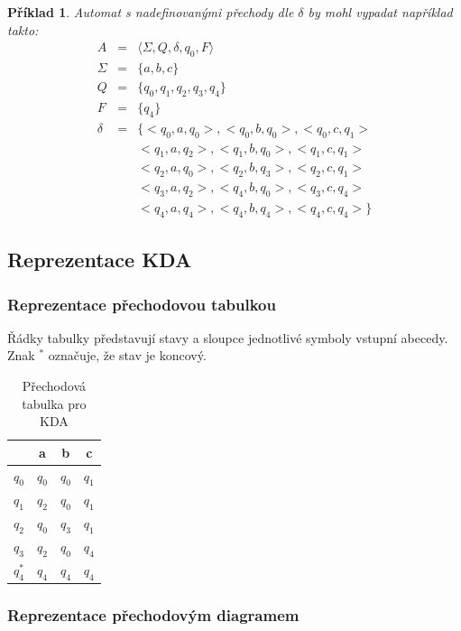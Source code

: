 \documentclass[10pt, a4paper, titlepage]{article}
\theoremstyle{note}
\newtheorem{priklad}{Příklad}
\begin{document}
\begin{priklad}
Automat s nadefinovanými přechody dle $\delta$ by mohl vypadat například takto:
\begin{eqnarray*}
A &=& \langle \Sigma, Q, \delta, q_0, F \rangle \\
\Sigma &=& \lbrace a, b, c \rbrace \\
Q &=& \lbrace q_0, q_1, q_2, q_3, q_4 \rbrace \\
F &=& \lbrace q_4 \rbrace \\
\delta &=& \lbrace <q_0, a, q_0>, <q_0, b, q_0>, <q_0, c, q_1> \\
& & <q_1, a, q_2>, <q_1, b, q_0>, <q_1, c, q_1> \\
& & <q_2, a, q_0>, <q_2, b, q_3>, <q_2, c, q_1> \\
& & <q_3, a, q_2>, <q_4, b, q_0>, <q_3, c, q_4> \\
& & <q_4, a, q_4>, <q_4, b, q_4>, <q_4, c, q_4> \rbrace
\end{eqnarray*}
\end{priklad}

\subsection{Reprezentace KDA}
\subsubsection{Reprezentace přechodovou tabulkou}

Řádky tabulky představují stavy a sloupce jednotlivé symboly vstupní abecedy. Znak $^*$ označuje, že stav je koncový.
\begin{table}[h]
\begin{center}
\begin{tabular}{r || c | c | c}
 & a & b & c \\
\hline
 $q_0$ & $q_0$ & $q_0$ & $q_1$ \\
 $q_1$ & $q_2$ & $q_0$ & $q_1$ \\
 $q_2$ & $q_0$ & $q_3$ & $q_1$ \\
 $q_3$ & $q_2$ & $q_0$ & $q_4$ \\
 $q_4^*$ & $q_4$ & $q_4$ & $q_4$ \\
\end{tabular}
\end{center}
\caption{Přechodová tabulka pro KDA}
\end{table}


\subsubsection{Reprezentace přechodovým diagramem}
\end{document}
